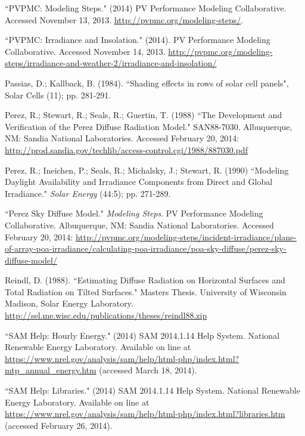 \documentclass[12pt,letterpaper]{article}
\begin{document}
\begin{thebibliography}{99}
``PVPMC: Modeling Steps." (2014) PV Performance Modeling Collaborative. Accessed November 13, 2013. \url{http://pvpmc.org/modeling-steps/}.

 ``PVPMC: Irradiance and Insolation." (2014). PV Performance Modeling Collaborative. Accessed November 14, 2013. \url{http://pvpmc.org/modeling-steps/irradiance-and-weather-2/irradiance-and-insolation/}

 Passias, D.; Kallback, B.  (1984). ``Shading effects in rows of solar cell panels", Solar Cells (11); pp. 281-291.

 Perez, R.; Stewart, R.; Seals, R.; Guertin, T. (1988) ``The Development and Verification of the Perez Diffuse Radiation Model." SAN88-7030. Albuquerque, NM: Sandia National Laboratories. Accessed February 20, 2014: \url{http://prod.sandia.gov/techlib/access-control.cgi/1988/887030.pdf}

 Perez, R.; Ineichen, P.; Seals, R.; Michalsky, J.; Stewart, R. (1990) ``Modeling Daylight Availability and Irradiance Components from Direct and Global Irradiance." \textit{Solar Energy} (44:5); pp. 271-289.

 ``Perez Sky Diffuse Model."  \textit{Modeling Steps}. PV Performance Modeling Collaborative. Albuquerque, NM: Sandia National Laboratories.  Accessed February 20, 2014: \url{http://pvpmc.org/modeling-steps/incident-irradiance/plane-of-array-poa-irradiance/calculating-poa-irradiance/poa-sky-diffuse/perez-sky-diffuse-model/}

 Reindl, D. (1988). ``Estimating Diffuse Radiation on Horizontal Surfaces and Total Radiation on Tilted Surfaces." Masters Thesis. University of Wisconsin Madison, Solar Energy Laboratory. \url{http://sel.me.wisc.edu/publications/theses/reindl88.zip}

 ``SAM Help: Hourly Energy." (2014) SAM 2014.1.14 Help System. National Renewable Energy Laboratory. Available on line at \url{https://www.nrel.gov/analysis/sam/help/html-php/index.html?mtp_annual_energy.htm} (accessed March 18, 2014).

 ``SAM Help: Libraries." (2014) SAM 2014.1.14 Help System. National Renewable Energy Laboratory. Available on line at \url{https://www.nrel.gov/analysis/sam/help/html-php/index.html?libraries.htm} (accessed February 26, 2014).


\end{thebibliography}
\end{document}
